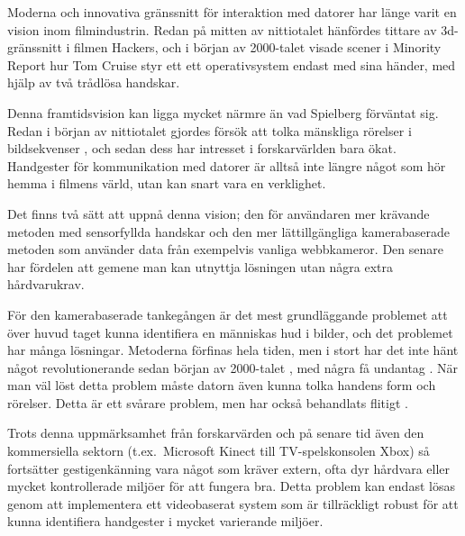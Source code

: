 \documentclass[../rapport_MVEX01-11-05]{subfiles}
\begin{document}
Moderna och innovativa gränssnitt för interaktion med datorer har länge varit
en vision inom filmindustrin. Redan på mitten av nittiotalet hänfördes
tittare av 3d-gränssnitt i filmen Hackers, och i början av 2000-talet visade
scener i Minority Report hur Tom Cruise styr ett ett operativsystem endast med
sina händer, med hjälp av två trådlösa handskar.

Denna framtidsvision kan
ligga mycket närmre än vad Spielberg förväntat sig. Redan i början av
nittiotalet gjordes försök att tolka mänskliga rörelser i bildsekvenser
\cite{Yamato92}, och sedan dess har intresset i forskarvärlden bara ökat.
Handgester för kommunikation med datorer är alltså inte längre något som
hör hemma i filmens värld, utan kan snart vara en verklighet.

Det finns två sätt att uppnå denna vision; den för användaren mer krävande
metoden med sensorfyllda handskar och den mer lättillgängliga kamerabaserade
metoden som använder data från exempelvis vanliga webbkameror. Den senare har
fördelen att gemene man kan utnyttja lösningen utan några extra hårdvarukrav.

För den kamerabaserade tankegången är det mest grundläggande problemet att över huvud taget kunna identifiera en människas hud i bilder, och det
problemet har många lösningar. Metoderna förfinas hela tiden, men i stort har
det inte hänt något revolutionerande sedan början av 2000-talet
\cite{Sebe04,Kruppa02,Albiol01,Brand00}, med några få undantag
. När man väl löst detta problem måste datorn
även kunna tolka handens form och rörelser. Detta är ett svårare problem, men
har också behandlats flitigt \cite{Pavlovic97,Garg09,Nielsen04,Zabulis09}.

%

Trots denna uppmärksamhet från forskarvärden och på senare tid även den kommersiella sektorn
 (t.ex.~Microsoft Kinect till TV-spelskonsolen Xbox) så fortsätter gestigenkänning vara något som
kräver extern, ofta dyr hårdvara eller mycket kontrollerade miljöer för att
fungera bra. Detta problem kan endast lösas genom att implementera ett
videobaserat system som är tillräckligt robust för att kunna identifiera
handgester i mycket varierande miljöer.
\end{document}
